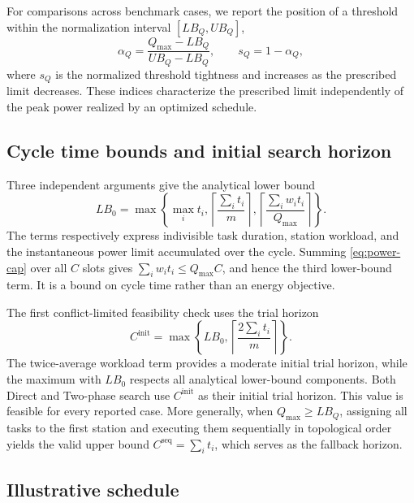 \documentclass[]{interact}
\theoremstyle{plain}
\theoremstyle{definition}
\theoremstyle{remark}
\newcommand{\Qmax}{Q_{\max}}
\newcommand{\Cinit}{C^{\mathrm{init}}}
\newcommand{\LBzero}{\ensuremath{LB_0}}
\begin{document}
For comparisons across benchmark cases, we report the position of a threshold within the normalization interval $[LB_Q,UB_Q]$,
\begin{equation}
\alpha_Q=\frac{\Qmax-LB_Q}{UB_Q-LB_Q},
\qquad
s_Q=1-\alpha_Q,
\label{eq:cap-severity}
\end{equation}
where $s_Q$ is the normalized threshold tightness and increases as the prescribed limit decreases. These indices characterize the prescribed limit independently of the peak power realized by an optimized schedule.

\subsection{Cycle time bounds and initial search horizon}

Three independent arguments give the analytical lower bound
\begin{equation}
\LBzero=\max\left\{
\max_i t_i,
\left\lceil\frac{\sum_i t_i}{m}\right\rceil,
\left\lceil\frac{\sum_i w_it_i}{\Qmax}\right\rceil
\right\}.
\label{eq:cycle-lb}
\end{equation}
The terms respectively express indivisible task duration, station workload, and the instantaneous power limit accumulated over the cycle. Summing \eqref{eq:power-cap} over all $C$ slots gives $\sum_i w_i t_i\leq \Qmax C$, and hence the third lower-bound term. It is a bound on cycle time rather than an energy objective.

The first conflict-limited feasibility check uses the trial horizon
\begin{equation}
\Cinit=\max\left\{\LBzero,
\left\lceil\frac{2\sum_i t_i}{m}\right\rceil\right\}.
\label{eq:c-init}
\end{equation}
The twice-average workload term provides a moderate initial trial horizon, while the maximum with $\LBzero$ respects all analytical lower-bound components. Both Direct and Two-phase search use $\Cinit$ as their initial trial horizon. This value is feasible for every reported case. More generally, when $\Qmax\geq LB_Q$, assigning all tasks to the first station and executing them sequentially in topological order yields the valid upper bound $C^{\mathrm{seq}}=\sum_i t_i$, which serves as the fallback horizon.

\subsection{Illustrative schedule}
\end{document}
